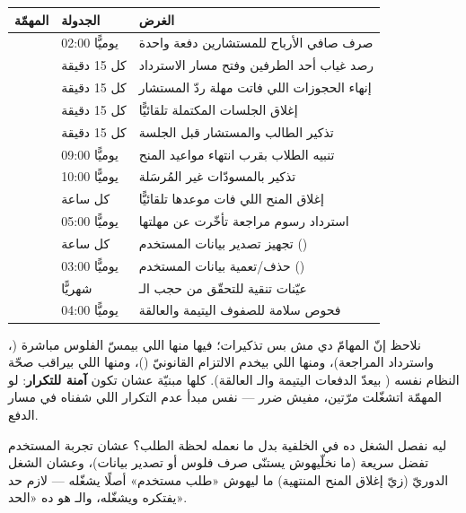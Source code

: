 \begin{center}
\begin{tabular}{L{4.9cm} L{2.5cm} L{5.1cm}}
\toprule
\textbf{\color{spPrimary}المهمّة} & \textbf{\color{spPrimary}الجدولة} & \textbf{\color{spPrimary}الغرض} \\
\midrule
{} & يوميًّا 02:00 & صرف صافي الأرباح للمستشارين دفعة واحدة \\
 & كل 15 دقيقة & رصد غياب أحد الطرفين وفتح مسار الاسترداد \\
 & كل 15 دقيقة & إنهاء الحجوزات اللي فاتت مهلة ردّ المستشار \\
 & كل 15 دقيقة & إغلاق الجلسات المكتملة تلقائيًّا \\
 & كل 15 دقيقة & تذكير الطالب والمستشار قبل الجلسة \\
 & يوميًّا 09:00 & تنبيه الطلاب بقرب انتهاء مواعيد المنح \\
 & يوميًّا 10:00 & تذكير بالمسودّات غير المُرسَلة \\
 & كل ساعة & إغلاق المنح اللي فات موعدها تلقائيًّا \\
 & يوميًّا 05:00 & استرداد رسوم مراجعة تأخّرت عن مهلتها \\
 & كل ساعة & تجهيز تصدير بيانات المستخدم () \\
 & يوميًّا 03:00 & حذف/تعمية بيانات المستخدم () \\
 & شهريًّا & عيّنات تنقية للتحقّق من حجب الـ  \\
 & يوميًّا 04:00 & فحوص سلامة للصفوف اليتيمة والعالقة \\
\bottomrule
\end{tabular}
\end{center}

نلاحظ إنّ المهامّ دي مش بس تذكيرات؛ فيها منها اللي بيمسّ الفلوس مباشرة
(، واسترداد المراجعة)، ومنها اللي بيخدم الالتزام القانونيّ
()، ومنها اللي بيراقب صحّة النظام نفسه ( بيعدّ
الدفعات اليتيمة والـ  العالقة). كلها مبنيّة عشان تكون
\textbf{آمنة للتكرار}: لو المهمّة اتشغّلت مرّتين، مفيش ضرر — نفس مبدأ عدم التكرار
اللي شفناه في مسار الدفع.

\begin{why}
ليه نفصل الشغل ده في الخلفية بدل ما نعمله لحظة الطلب؟ عشان تجربة المستخدم تفضل
سريعة (ما نخلّيهوش يستنّى صرف فلوس أو تصدير بيانات)، وعشان الشغل الدوريّ (زيّ
إغلاق المنح المنتهية) ما ليهوش «طلب مستخدم» أصلًا يشغّله — لازم حد يفتكره ويشغّله،
والـ  هو ده «الحد».
\end{why}

